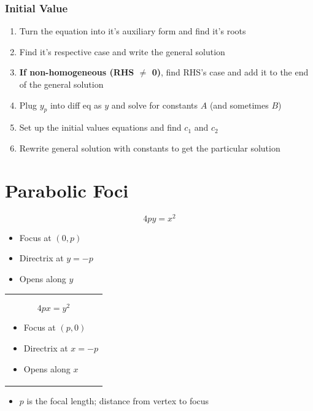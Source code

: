 \documentclass[12pt]{article}
\begin{document}
\subsubsection{Initial Value}
\begin{enumerate}
    \item Turn the equation  into it's auxiliary form and find it's roots
    \item Find it's respective case and write the general solution
    \item \textbf{If non-homogeneous (RHS $\neq$ 0)}, find RHS's case and add it to the end of the general solution
    \item {} Plug $y_p$ into diff eq as $y$ and solve for constants $A$ (and  sometimes $B$)
    \item Set up the initial values equations and find $c_1$ and $c_2$
    \item Rewrite general solution with constants to get the particular solution
\end{enumerate}

\section{Parabolic Foci}
\begin{minipage}{0.5\textwidth}
$$4py=x^2$$
\begin{itemize}
    \item Focus at $(0,p)$
    \item Directrix at $y=-p$
    \item Opens along $y$
\end{itemize}

\end{minipage}
\begin{minipage}{0.45\textwidth}
\begin{tabular}{|p{\textwidth}}

$$4px=y^2$$
\begin{itemize}
    \item Focus at $(p,0)$
    \item Directrix at $x=-p$
    \item Opens along $x$
\end{itemize}

\end{tabular}
\end{minipage}
\begin{itemize}
    \item $p$ is the focal length; distance from vertex to focus
\end{itemize}
\end{document}
